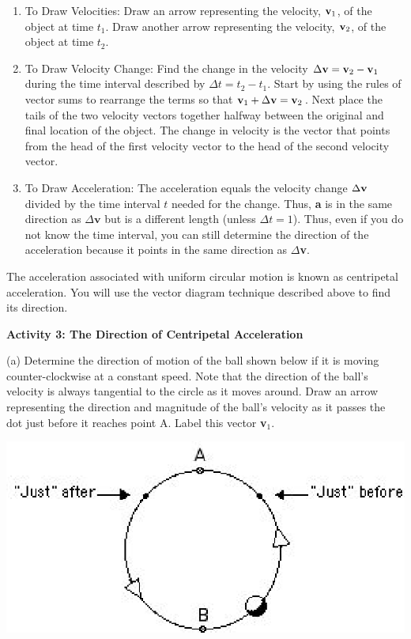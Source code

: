 \begin{enumerate}
\item To Draw Velocities: Draw an arrow representing the velocity, \( {\bf v}_{1} \), of
the object at time \( t_{1} \). Draw another arrow representing the velocity,
\( {\bf v}_{2} \), of the object at time \( t_{2} \). 
\item To Draw Velocity Change: Find the change in the velocity \( \Delta 
{\bf v}
= {\bf v}_{2}  - {\bf v}_{1} \) during the time interval described
by \( \Delta  t = t_{2} - t_{1} \). Start by using the rules of
vector sums to rearrange the terms so that ${\bf v}_{1} + \Delta {\bf v}
= {\bf v}_{2}$. Next place the tails of the two velocity vectors together
halfway between the original and final location of the object. The change in
velocity is the vector that points from the head of the first velocity vector
to the head of the second velocity vector. 
\item To Draw Acceleration: The acceleration equals the velocity change 
\( \Delta  {\bf v}\)
divided by the time interval $t$ needed for the change. Thus, \textbf{a} is in
the same direction as \( \Delta  \textbf{v}\) but is a different length (unless
 \( \Delta  t = 1\)). Thus, even if you do not know the time interval, you
can still determine the direction of the acceleration because it points in the
same direction as \( \Delta  \)\textbf{v}. 
\end{enumerate}
The acceleration associated with uniform circular motion is known as centripetal
acceleration. You will use the vector diagram technique described above to find
its direction. 

\newpage

\textbf{Activity 3: The Direction of Centripetal Acceleration }

(a) Determine the direction of motion of the ball shown below if it is moving
counter-clockwise at a constant speed. Note that the direction of the ball's
velocity is always tangential to the circle as it moves around. Draw an arrow
representing the direction and magnitude of the ball's velocity as it passes
the dot just before it reaches point A. Label this vector \textbf{v}\( _{1} \). 

\vspace{0.3cm}
{\par\centering \includegraphics{circ_motion/circ_motion_fig2.eps} \par}
\vspace{0.3cm}

